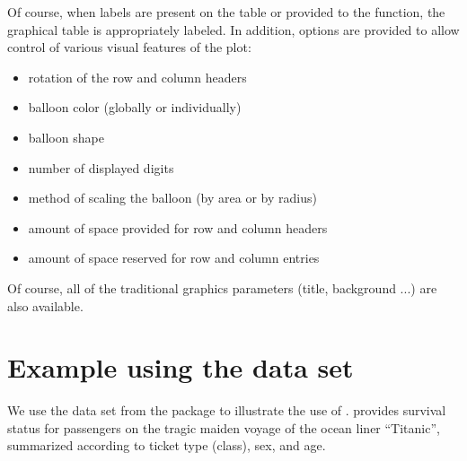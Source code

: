 \documentclass[a4paper]{report}
\begin{document}
\begin{article}
Of course, when labels are present on the table or provided to the
function, the graphical table is appropriately labeled.  In
addition, options are provided to allow control of various visual features
of the plot:
\begin{itemize}
  \item rotation of the row and column headers
  \item balloon color (globally or individually) 
  \item balloon shape 
  \item number of displayed digits
  \item method of scaling the balloon (by area or by radius)
  \item amount of space provided for row and column headers
  \item amount of space reserved for row and column entries
\end{itemize}
Of course, all of the traditional graphics parameters (title,
background ...) are also available.


\section*{Example using the  data set}

We use the  data set from the  package
to illustrate the use of .  
provides survival status for passengers on the tragic maiden voyage
of the ocean liner ``Titanic'', summarized according to ticket type
(class), sex, and age.





\end{article}
\end{document}
